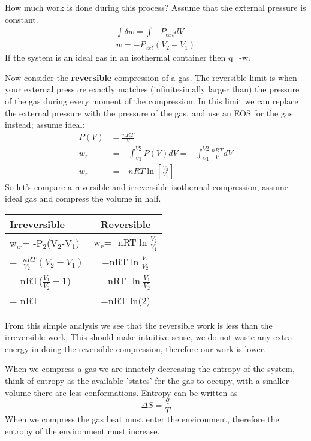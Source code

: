 \documentclass{article}
\begin{document}
How much work is done during this process? 
Assume that the external pressure is constant. 
\begin{equation}
\begin{split}
        \int \delta w = \int-P_{ext}dV \\
        w = -P_{ext}(V_2-V_1)
\end{split}
\end{equation}
If the system is an ideal gas in an isothermal container then q=-w.  

Now consider the \textbf{reversible} compression of a gas. 
The reversible limit is when your external pressure exactly matches (infinitesimally larger than) the pressure of the gas during every moment of the compression.
In this limit we can replace the external pressure with the pressure of the gas, and use an EOS for the gas instead; assume ideal:
\begin{equation}
\begin{split}
    P(V) &= \frac{nRT}{V} \\
    w_{r} &= -\int_{V1}^{V2} P(V)dV = -\int_{V1}^{V2} \frac{nRT}{V} dV \\
    w_{r} &= -nRT\ln \left[\frac{V_2}{V_1}\right]
\end{split}
\end{equation}
So let's compare a reversible and irreversible isothermal compression, assume ideal gas and compress the volume in half. 
\begin{center}
  \begin{tabular}{ | l | c |}
    \hline
    Irreversible & Reversible  \\ \hline
     w$_{ir}$= -P$_2$(V$_2$-V$_1$) & w$_r$= -nRT$\ln\frac{V_2}{V_1}$  \\ \hline
    =$\frac{-nRT}{V_2}(V_2-V_1)$ & =nRT$\ln\frac{V_1}{V_2}$  \\ \hline
    = nRT($\frac{V_1}{V_2}-1$) & =nRT $\ln\frac{V_1}{V_2}$ \\ \hline
    = nRT & =nRT ln(2)\\
    \hline
  \end{tabular}
\end{center}
From this simple analysis we see that the reversible work is less than the irreversible work. 
This should make intuitive sense, we do not waste any extra energy in doing the reversible compression, therefore our work is lower. 

When we compress a gas we are innately decreasing the entropy of the system, think of entropy as the available 'states' for the gas to occupy, with a smaller volume there are less conformations. 
Entropy can be written as 
\begin{equation}
\Delta S = \frac{q}{T}
\end{equation}
When we compress the gas heat must enter the environment, therefore the entropy of the environment must increase. 
\end{document}
